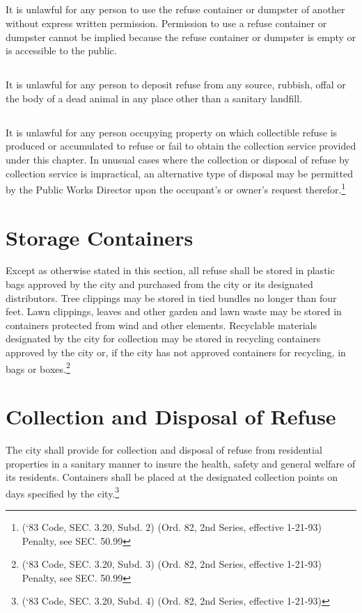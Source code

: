 \subsection{}
It is unlawful for any person to use the refuse container or dumpster of another without express written permission.  Permission to use a refuse container or dumpster cannot be implied because the refuse container or dumpster is empty or is accessible to the public.
\subsection{}
It is unlawful for any person to deposit refuse from any source, rubbish, offal or the body of a dead animal in any place other than a sanitary landfill.
\subsection{}
It is unlawful for any person occupying property on which collectible refuse is produced or accumulated to refuse or fail to obtain the collection service provided under this chapter.  In unusual cases where the collection or disposal of refuse by collection service is impractical, an alternative type of disposal may be permitted by the Public Works Director upon the occupant’s or owner’s request therefor.\footnote{(‘83 Code, SEC. 3.20, Subd. 2) (Ord. 82, 2nd Series, effective 1-21-93) Penalty, see SEC. 50.99}
\section{Storage Containers}
Except as otherwise stated in this section, all refuse shall be stored in plastic bags approved by the city and purchased from the city or its designated distributors.  Tree clippings may be stored in tied bundles no longer than four feet.  Lawn clippings, leaves and other garden and lawn waste may be stored in containers protected from wind and other elements.  Recyclable materials designated by the city for collection may be stored in recycling containers approved by the city or, if the city has not approved containers for recycling, in bags or boxes.\footnote{(‘83 Code, SEC. 3.20, Subd. 3) (Ord. 82, 2nd Series, effective 1-21-93) Penalty, see SEC. 50.99}
\section{Collection and Disposal of Refuse}
The city shall provide for collection and disposal of refuse from residential properties in a sanitary manner to insure the health, safety and general welfare of its residents.  Containers shall be placed at the designated collection points on days specified by the city.\footnote{(‘83 Code, SEC. 3.20, Subd. 4) (Ord. 82, 2nd Series, effective 1-21-93)}
